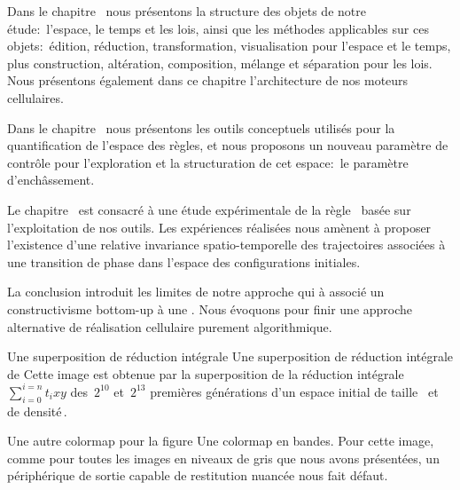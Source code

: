Dans le chapitre~ nous pr\'esentons la
structure des objets de notre \'etude:~l'espace, le temps et les lois, %
ainsi que les m\'ethodes applicables sur ces objets:~\'edition, r\'eduction,
transformation, visualisation pour l'espace et le temps, plus
construction, alt\'eration, composition, m\'elange et s\'eparation pour les
lois. %
Nous pr\'esentons \'egalement dans ce chapitre l'architecture de nos
moteurs cellulaires. %

Dans le chapitre~ nous pr\'esentons les outils
conceptuels utilis\'es pour la quantification de l'espace des r\`egles, et
nous proposons un nouveau param\`etre de contr\^ole pour l'exploration et
la structuration de cet espace:~le param\`etre d'ench\^assement. %

Le chapitre~ est consacr\'e \`a une \'etude
exp\'erimentale de la r\`egle~ bas\'ee sur l'exploitation de
nos outils. %
Les exp\'eriences r\'ealis\'ees nous am\`enent \`a proposer l'existence d'une
relative invariance spatio-temporelle des trajec\-toires associ\'ees \`a
une transition de phase dans l'espace des configurations initiales. %

La conclusion introduit les limites de notre approche qui \`a associ\'e
un constructivisme bottom-up \`a une . %
Nous \'evoquons pour finir une approche alternative de r\'ealisation
cellulaire purement algorithmique. %

%
{Une superposition de r\'eduction int\'egrale}%
{Une superposition de r\'eduction int\'egrale de }%
{Cette image est obtenue par la superposition de la r\'eduction int\'egrale
  $\sum_{i=0}^{i=n}t_{i}xy$ des~$2^{10}$ et~$2^{13}$ premi\`eres
  g\'en\'erations d'un espace initial de taille~ et de
  densit\'e\,\Sundemi.}

%
{}%
{Une autre colormap pour la figure
  \protect{}}%
{Une colormap en bandes. %
  Pour cette image, comme pour toutes les images en niveaux de gris
  que nous avons pr\'esent\'ees, un p\'eriph\'erique de sortie capable de
  restitution nuanc\'ee nous fait d\'efaut.}

